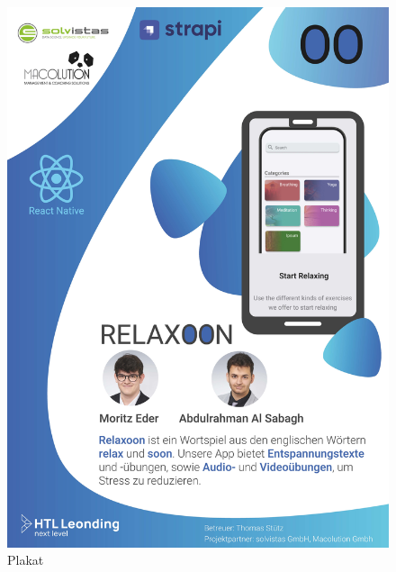 \begin{figure}[H]
    \centering
    \includegraphics[height=1.2\textwidth]{./pics/Relaxoon-Plakat.jpg}
    \caption{Plakat}
\end{figure}




